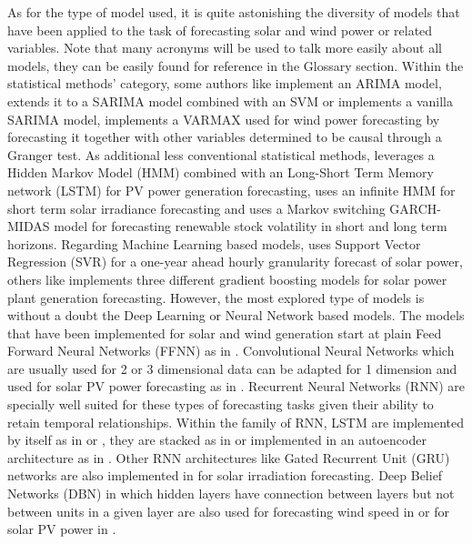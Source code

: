 As for the type of model used, it is quite astonishing the diversity of models that have been applied to the task of forecasting solar and wind power or related variables. Note that many acronyms will be used to talk more easily about all models, they can be easily found for reference in the Glossary section. Within the statistical methods' category, some authors like \cite{pedro_coimbra_2012} implement an ARIMA model, \cite{m_bouzerdoum_mellit_pavan_2013} extends it to a SARIMA model combined with an SVM or \cite{haddad_nicod_2019} implements a vanilla SARIMA model, \cite{jain_none_behera_2022} implements a VARMAX used for wind power forecasting by forecasting it together with other variables determined to be causal through a Granger test. As additional less conventional statistical methods, \cite{delgado_estefan_neill_carrillo_andrade_2024} leverages a Hidden Markov Model (HMM) combined with an Long-Short Term Memory network (LSTM) for PV power generation forecasting, \cite{frimane_munkhammar_van_meer_2022} uses an infinite HMM for short term solar irradiance forecasting and \cite{wang_wu_cao_hong_2022} uses a Markov switching GARCH-MIDAS model for forecasting renewable stock volatility in short and long term horizons. 
Regarding Machine Learning based models, \cite{abuella_chowdhury_2016} uses Support Vector Regression (SVR) for a one-year ahead hourly granularity forecast of solar power, others like \cite{aksoy_istemihan_genc_2023} implements three different gradient boosting models for solar power plant generation forecasting. 
However, the most explored type of models is without a doubt the Deep Learning or Neural Network based models. The models that have been implemented for solar and wind generation start at plain Feed Forward Neural Networks (FFNN) as in \cite{pedro_coimbra_2012}. Convolutional Neural Networks which are usually used for 2 or 3 dimensional data can be adapted for 1 dimension and used for solar PV power forecasting as in \cite{huang_kuo_2019}. Recurrent Neural Networks (RNN) are specially well suited for these types of forecasting tasks given their ability to retain temporal relationships. Within the family of RNN, LSTM are implemented by itself as in \cite{abdel_nasser_mahmoud_2017} or \cite{hossain_mahmood_2020}, they are stacked as in \cite{liang_nguyen_jin_2018} or implemented in an autoencoder architecture as in \cite{suresh_janik_guerrero_leonowicz_sikorski_2020}. Other RNN architectures like Gated Recurrent Unit (GRU) networks are also implemented in \cite{learning_2017} for solar irradiation forecasting. Deep Belief Networks (DBN) in which hidden layers have connection between layers but not between units in a given layer are also used for forecasting wind speed in \cite{lin_pai_ting_2019} or for solar PV power in \cite{neo_teo_woo_t_logenthiran_sharma_2017}. 

